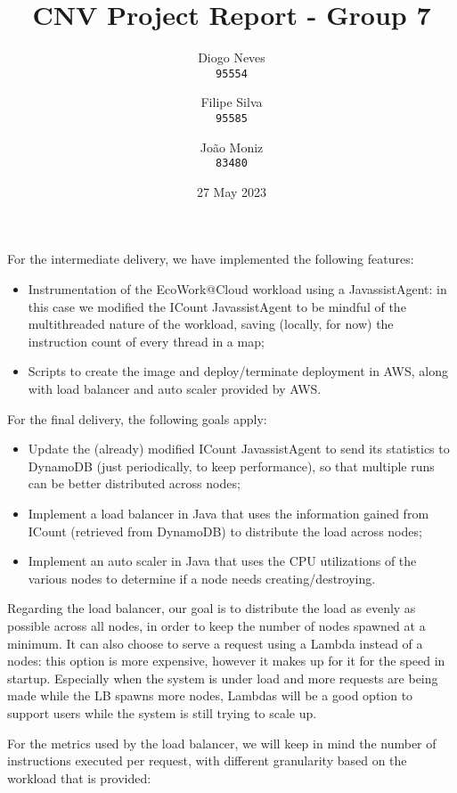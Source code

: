 \documentclass{article}
\date{27 May 2023}
\title{CNV Project Report - Group 7}
\author{
    Diogo Neves \\
    \texttt{95554}
    \and
    Filipe Silva \\
    \texttt{95585}
    \and
    João Moniz \\
    \texttt{83480}
}
\begin{document}
\twocolumn

\maketitle

For the intermediate delivery, we have implemented the following features:
\begin{itemize}
    \item Instrumentation of the EcoWork@Cloud workload using a JavassistAgent:
        in this case we modified the ICount JavassistAgent to be mindful of the
        multithreaded nature of the workload, saving (locally, for now) the
        instruction count of every thread in a map;
    \item Scripts to create the image and deploy/terminate deployment in AWS,
        along with load balancer and auto scaler provided by AWS.
\end{itemize}

For the final delivery, the following goals apply:
\begin{itemize}
    \item Update the (already) modified ICount JavassistAgent to send its
        statistics to DynamoDB (just periodically, to keep performance), so that
        multiple runs can be better distributed across nodes;
    \item Implement a load balancer in Java that uses the information gained
        from ICount (retrieved from DynamoDB) to distribute the load across
        nodes;
    \item Implement an auto scaler in Java that uses the CPU utilizations of the
        various nodes to determine if a node needs creating/destroying.
\end{itemize}

Regarding the load balancer, our goal is to distribute the load as evenly as
possible across all nodes, in order to keep the number of nodes spawned at a
minimum. It can also choose to serve a request using a Lambda instead of a
nodes: this option is more expensive, however it makes up for it for the speed
in startup. Especially when the system is under load and more requests are being
made while the LB spawns more nodes, Lambdas will be a good option to support
users while the system is still trying to scale up.

For the metrics used by the load balancer, we will keep in mind the number of
instructions executed per request, with different granularity based on the
workload that is provided:
\end{document}
